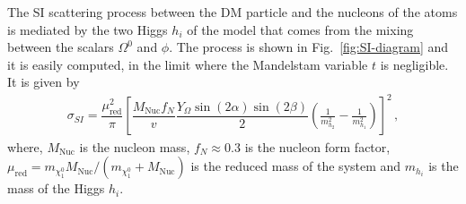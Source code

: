 \documentclass[12pt,letterpaper]{article}
\begin{document}
The SI scattering process between the DM particle and the nucleons of the atoms is mediated by the two Higgs $h_i$ of the model that comes from the mixing between the scalars $\Omega^0$ and $\phi$. 
The process is shown in Fig.~\ref{fig:SI-diagram} and it is easily computed, in the limit where the  Mandelstam variable $t$ is negligible. It is given by
\begin{align}
\label{eq:sigma-SI}
\sigma_{SI}=\dfrac{\mu_{\text{red}}^2}{\pi}\left[\dfrac{M_{\text{Nuc}}f_N}{v}\dfrac{Y_{\Omega}\sin(2\alpha)\sin(2\beta)}{2}\left(\frac{1}{m_{h_2}^2}-\frac{1}{m_{h_1}^2}\right)\right]^2\,,
\end{align}
where, $M_{\text{Nuc}}$ is the nucleon mass, $f_N\approx 0.3$ is the nucleon form factor, $\mu_{\text{red}}= m_{\chi^0_1}M_{\text{Nuc}}/(m_{\chi^0_1}+M_{\text{Nuc}})$ is the reduced mass of the system and  $m_{h_i}$ is the mass of the Higgs $h_i$.
\end{document}
